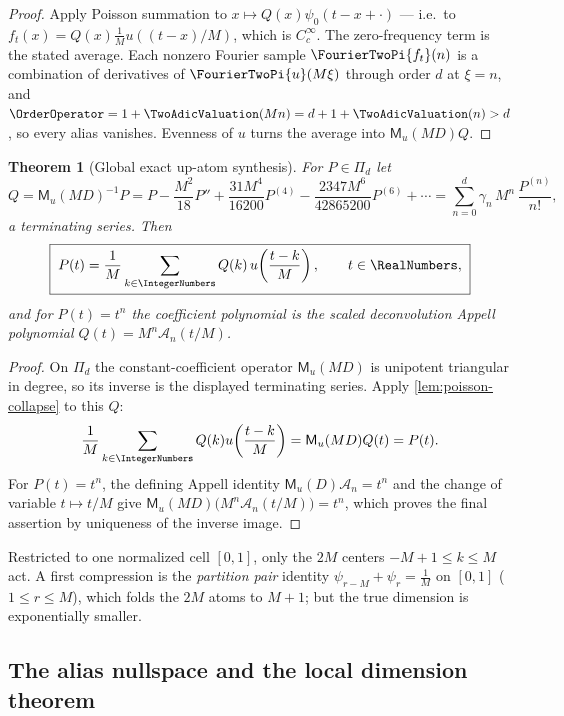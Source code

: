 \documentclass[11pt,oneside]{article}
\numberwithin{equation}{section}
\newtheorem{theorem}{Theorem}[section]
\theoremstyle{definition}
\theoremstyle{remark}
\newcommand{\MM}{\mathsf M}
\newcommand{\Gd}{\mathcal A}
\newcommand{\PiD}{\Pi_d}
\begin{document}
\begin{proof}
Apply Poisson summation to $x\mapsto Q(x)\psi_0(t-x+\cdot)$ --- i.e.\
to $f_t(x)=Q(x)\frac1Mu((t-x)/M)$, which is $C_c^\infty$.  The
zero-frequency term is the stated average.  Each nonzero Fourier
sample $\FourierTwoPi{f_t}(n)$ is a combination of derivatives of
$\FourierTwoPi{u}(M\xi)$ through order $d$ at $\xi=n$, and
$\OrderOperator=1+\TwoAdicValuation(Mn)=d+1+\TwoAdicValuation(n)>d$, so every alias vanishes.  Evenness
of $u$ turns the average into $\MM_u(MD)Q$.
\end{proof}

\begin{theorem}[Global exact up-atom synthesis]
\label{thm:global-synthesis}
For $P\in\PiD$ let
\begin{equation}
 Q=\MM_u(MD)^{-1}P
 =P-\frac{M^{2}}{18}P''
 +\frac{31M^{4}}{16200}P^{(4)}
 -\frac{2347M^{6}}{42865200}P^{(6)}+\cdots
 =\sum_{n=0}^{d}\gamma_n\,M^{n}\,\frac{P^{(n)}}{n!},
 \label{eq:Q-deconv}
\end{equation}
a terminating series.  Then
\begin{equation}
 \boxed{\;
 P(t)=\frac1M\sum_{k\in\IntegerNumbers}Q(k)\,
 u\!\left(\frac{t-k}{M}\right),
 \qquad t\in\RealNumbers,
 \;}
 \label{eq:global-synthesis}
\end{equation}
and for $P(t)=t^{n}$ the coefficient polynomial is the scaled
deconvolution Appell polynomial
$Q(t)=M^{n}\Gd_n(t/M)$.
\end{theorem}

\begin{proof}
On $\PiD$ the constant-coefficient operator $\MM_u(MD)$ is unipotent
triangular in degree, so its inverse is the displayed terminating series.
Apply \cref{lem:poisson-collapse} to this $Q$:
\[
 \frac1M\sum_{k\in\IntegerNumbers}Q(k)u\!\left(\frac{t-k}{M}\right)
 =\MM_u(MD)Q(t)=P(t).
\]
For $P(t)=t^n$, the defining Appell identity
$\MM_u(D)\Gd_n=t^n$ and the change of variable $t\mapsto t/M$ give
$\MM_u(MD)\bigl(M^n\Gd_n(t/M)\bigr)=t^n$, which proves the final
assertion by uniqueness of the inverse image.
\end{proof}

Restricted to one normalized cell $[0,1]$, only the $2M$ centers
$-M+1\le k\le M$ act.  A first compression is the \emph{partition
pair} identity $\psi_{r-M}+\psi_r=\tfrac1M$ on $[0,1]$
($1\le r\le M$), which folds the $2M$ atoms to $M+1$; but the true
dimension is exponentially smaller.

\subsection{The alias nullspace and the local dimension theorem}
\end{document}
